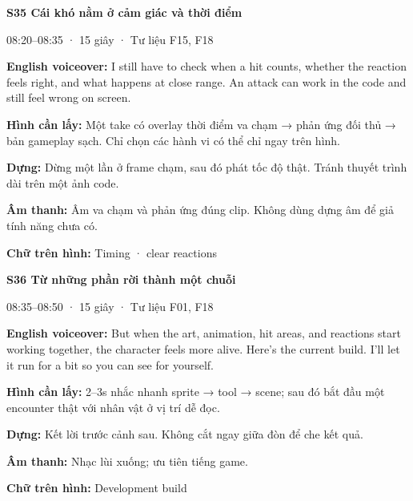 \documentclass[10pt,a4paper]{article}
\begin{document}
\textbf{S35 Cái khó nằm ở cảm giác và thời điểm}\par

08:20–08:35 · 15 giây · Tư liệu F15, F18\par

\textbf{English voiceover:}  I still have to check when a hit counts, whether the reaction feels right, and what happens at close range. An attack can work in the code and still feel wrong on screen.\par

\textbf{Hình cần lấy:}  Một take có overlay thời điểm va chạm → phản ứng đối thủ → bản gameplay sạch. Chỉ chọn các hành vi có thể chỉ ngay trên hình.\par

\textbf{Dựng:}  Dừng một lần ở frame chạm, sau đó phát tốc độ thật. Tránh thuyết trình dài trên một ảnh code.\par

\textbf{Âm thanh:}  Âm va chạm và phản ứng đúng clip. Không dùng dựng âm để giả tính năng chưa có.\par

\textbf{Chữ trên hình:}  Timing · clear reactions\par

\clearpage

\textbf{S36 Từ những phần rời thành một chuỗi}\par

08:35–08:50 · 15 giây · Tư liệu F01, F18\par

\textbf{English voiceover:}  But when the art, animation, hit areas, and reactions start working together, the character feels more alive. Here’s the current build. I’ll let it run for a bit so you can see for yourself.\par

\textbf{Hình cần lấy:}  2–3s nhắc nhanh sprite → tool → scene; sau đó bắt đầu một encounter thật với nhân vật ở vị trí dễ đọc.\par

\textbf{Dựng:}  Kết lời trước cảnh sau. Không cắt ngay giữa đòn để che kết quả.\par

\textbf{Âm thanh:}  Nhạc lùi xuống; ưu tiên tiếng game.\par

\textbf{Chữ trên hình:}  Development build\par
\end{document}
